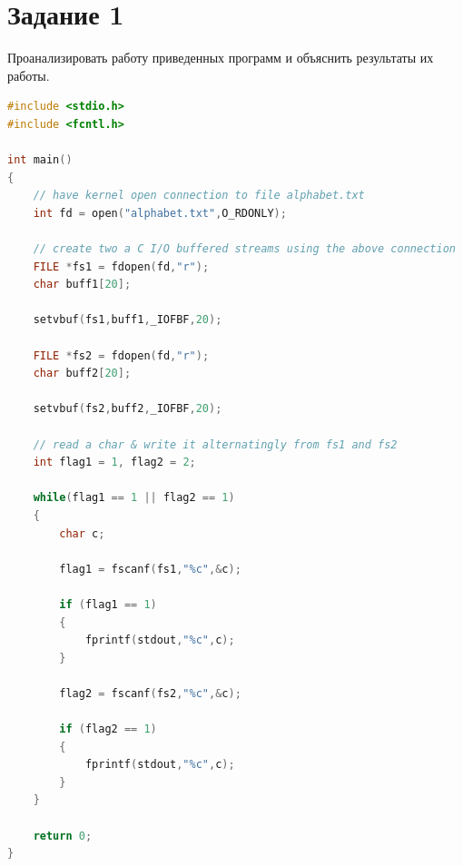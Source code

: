 \newpage
\section*{Задание 1}

\Large Проанализировать работу приведенных программ и объяснить результаты их работы.
\newline

\begin{lstlisting}[language=c,label=some-code1,caption=Программа 1]
#include <stdio.h>
#include <fcntl.h>

int main()
{
	// have kernel open connection to file alphabet.txt
	int fd = open("alphabet.txt",O_RDONLY);

	// create two a C I/O buffered streams using the above connection 
	FILE *fs1 = fdopen(fd,"r");
	char buff1[20];
	
	setvbuf(fs1,buff1,_IOFBF,20);

	FILE *fs2 = fdopen(fd,"r");
	char buff2[20];
	
	setvbuf(fs2,buff2,_IOFBF,20);

	// read a char & write it alternatingly from fs1 and fs2
	int flag1 = 1, flag2 = 2;
	
	while(flag1 == 1 || flag2 == 1)
	{
		char c;
		
		flag1 = fscanf(fs1,"%c",&c);
		
		if (flag1 == 1) 
		{
			fprintf(stdout,"%c",c);
		}
		
		flag2 = fscanf(fs2,"%c",&c);
		
		if (flag2 == 1) 
		{ 
			fprintf(stdout,"%c",c); 
		}
	}
	
	return 0;
}
\end{lstlisting} 

